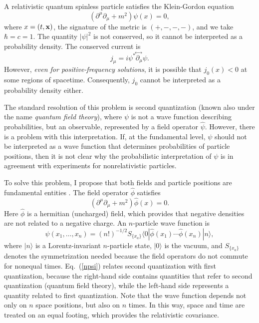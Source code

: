\documentclass[10pt,twoside]{aipproc} %
\begin{document}
A relativistic quantum spinless particle satisfies
the Klein-Gordon equation 
\begin{equation}
(\partial^{\mu}\partial_{\mu}+m^2)\psi(x)=0 ,
\end{equation}
where $x=(t,\bf{x})$, the signature of the metric 
is $(+,-,-,-)$, and we take $\hbar=c=1$.
The quantity $|\psi|^2$ is not conserved, so it cannot be 
interpreted as a probability density. 
The conserved current is 
\begin{equation}
j_{\mu}=i\psi^* \!\stackrel{\leftrightarrow\;}{\partial_{\mu}}\! \psi .
\end{equation}
However, {\em even for positive-frequency solutions}, it is possible that 
$j_0(x)<0$ at some regions of spacetime. 
Consequently, $j_0$ cannot be interpreted as a probability density either. 

The standard resolution of this problem is 
second quantization (known also under the name {\em quantum field theory}), 
where $\psi$ is not a 
wave function describing probabilities, but an observable, represented 
by a field operator $\hat{\psi}$. 
However, there is a problem with this interpretation.
If, at the fundamental level,
$\psi$ should not be interpreted as a wave function
that determines probabilities of particle positions, then
it is not clear
why the probabilistic interpretation of $\psi$ is in 
agreement with experiments for nonrelativistic particles. 

To solve this problem, I propose that both fields and particle positions 
are fundamental entities \cite{nikolfpl1,nikolfpl2}. 
The field operator $\hat{\phi}$ satisfies
\begin{equation}
(\partial^{\mu}\partial_{\mu}+m^2)\hat{\phi}(x)=0 .
\end{equation}
Here
$\hat{\phi}$ is a hermitian (uncharged) field, which provides that
negative densities are not related to a negative charge. 
An $n$-particle wave function is
\begin{equation}\label{npsi}
\psi(x_1,\ldots ,x_n)=(n!)^{-1/2}S_{\{ x_a\} }
\langle 0|\hat{\phi}(x_1)\cdots\hat{\phi}(x_n)|n\rangle ,
\end{equation}
where $|n\rangle$ is a Lorentz-invariant $n$-particle state, 
$|0\rangle$ is the vacuum, and $S_{\{ x_a\} }$ denotes the symmetrization
needed because the field operators do not commute for nonequal times.
Eq.~(\ref{npsi}) relates second quantization with first quantization, 
because the right-hand side contains quantities that refer to 
second quantization (quantum field theory), while the left-hand side 
represents a quantity related to first quantization.
Note that the wave function depends not only on $n$ 
space positions, but also on $n$ times. In this way, 
space and time are treated on an equal footing, which provides the 
relativistic covariance.
\end{document}

